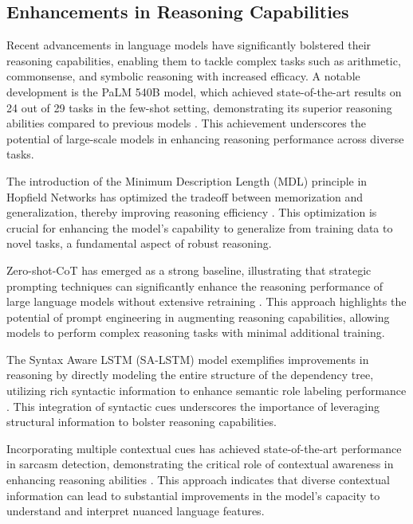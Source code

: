 \subsection{Enhancements in Reasoning Capabilities} \label{subsec:Enhancements in Reasoning Capabilities}

Recent advancements in language models have significantly bolstered their reasoning capabilities, enabling them to tackle complex tasks such as arithmetic, commonsense, and symbolic reasoning with increased efficacy. A notable development is the PaLM 540B model, which achieved state-of-the-art results on 24 out of 29 tasks in the few-shot setting, demonstrating its superior reasoning abilities compared to previous models \cite{chowdhery2023palm}. This achievement underscores the potential of large-scale models in enhancing reasoning performance across diverse tasks.



The introduction of the Minimum Description Length (MDL) principle in Hopfield Networks has optimized the tradeoff between memorization and generalization, thereby improving reasoning efficiency \cite{abudy2023minimumdescriptionlengthhopfield}. This optimization is crucial for enhancing the model's capability to generalize from training data to novel tasks, a fundamental aspect of robust reasoning.



Zero-shot-CoT has emerged as a strong baseline, illustrating that strategic prompting techniques can significantly enhance the reasoning performance of large language models without extensive retraining \cite{kojima2022large}. This approach highlights the potential of prompt engineering in augmenting reasoning capabilities, allowing models to perform complex reasoning tasks with minimal additional training.



The Syntax Aware LSTM (SA-LSTM) model exemplifies improvements in reasoning by directly modeling the entire structure of the dependency tree, utilizing rich syntactic information to enhance semantic role labeling performance \cite{qian2017syntaxawarelstmmodel}. This integration of syntactic cues underscores the importance of leveraging structural information to bolster reasoning capabilities.



Incorporating multiple contextual cues has achieved state-of-the-art performance in sarcasm detection, demonstrating the critical role of contextual awareness in enhancing reasoning abilities \cite{nimase2024morecontextshelpsarcasm}. This approach indicates that diverse contextual information can lead to substantial improvements in the model's capacity to understand and interpret nuanced language features.



